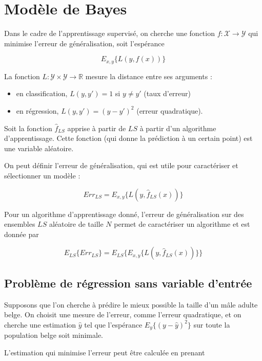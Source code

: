 \chapter{Modèle de Bayes}

Dans le cadre de l'apprentissage supervisé, on cherche une fonction $f : \mathcal{X} \rightarrow \mathcal{Y}$ qui minimise l'erreur de généralisation, soit l'espérance

$$E_{x, y} \{L(y, f(x))\}$$

La fonction $L : \mathcal{Y} \times \mathcal{Y} \rightarrow \mathbb{R}$ mesure la distance entre ses arguments :

\begin{itemize}
	\item en classification, $L(y, y') = 1$ si $y \neq y'$ (taux d'erreur)
	\item en régression, $L(y, y') = (y - y')^2$ (erreur quadratique).
\end{itemize}

Soit la fonction $\hat{f}_{LS}$ apprise à partir de $LS$ à partir d'un algorithme d'apprentissage. Cette fonction (qui donne la prédiction à un certain point) est une variable aléatoire.


On peut définir l'erreur de généralisation, qui est utile pour caractériser et sélectionner un modèle :

$$Err_{LS} = E_{x, y} \{L(y, \hat{f}_{LS}(x))\}$$

Pour un algorithme d'apprentissage donné, l'erreur de généralisation sur des ensembles $LS$ aléatoire de taille $N$ permet de caractériser un algorithme et est donnée par

$$E_{LS}\{Err_{LS}\} = E_{LS}\{E_{x, y} \{L(y, \hat{f}_{LS}(x))\} \}$$

	\section{Problème de régression sans variable d'entrée}
	
	Supposons que l'on cherche à prédire le mieux possible la taille d'un mâle adulte belge. On choisit une mesure de l'erreur, comme l'erreur quadratique, et on cherche une estimation $\hat{y}$ tel que l'espérance $E_y\{(y - \hat{y})^2\}$ sur toute la population belge soit minimale.
	
	
	L'estimation qui minimise l'erreur peut être calculée en prenant 
	
